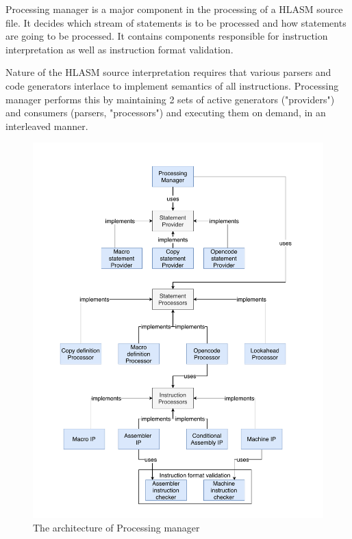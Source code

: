 \label{chap:process}
Processing manager is a major component in the processing of a HLASM source file. It decides which stream of statements is to be processed and how statements are going to be processed. It contains components responsible for instruction interpretation as well as instruction format validation. 

Nature of the HLASM source interpretation requires that various parsers and code generators interlace to implement semantics of all instructions. Processing manager performs this by maintaining 2 sets of active generators ("providers") and consumers (parsers, "processors") and executing them on demand, in an interleaved manner.

\begin{figure}
	\centering
	\includegraphics[width=\textwidth]{img/processing_manager_arch}
	\caption{The architecture of Processing manager}
	\label{fig06:proc_mngr}
\end{figure}


